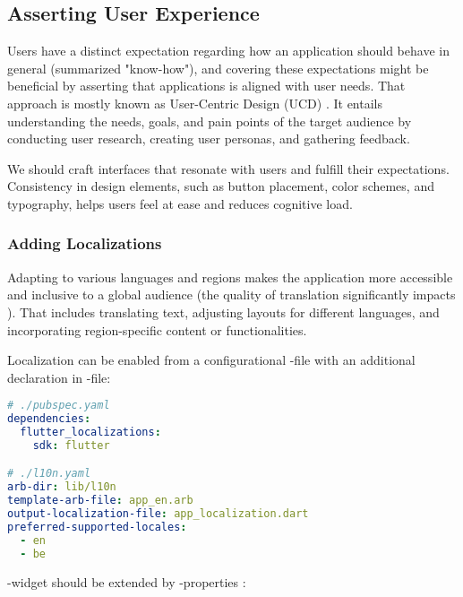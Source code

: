 
\subsection{Asserting User Experience}

Users have a distinct expectation regarding how an application should behave in general (summarized "know-how"), and 
covering these expectations might be beneficial by asserting that applications is aligned with user needs. That approach
is mostly known as User-Centric Design (UCD) \cite{Stil16}. It entails understanding the needs, goals, and pain points 
of the target audience by conducting user research, creating user personas, and gathering feedback. 

We should craft interfaces that resonate with users and fulfill their expectations. Consistency in design elements, 
such as button placement, color schemes, and typography, helps users feel at ease and reduces cognitive load.


\subsubsection{Adding Localizations} \label{locale}

Adapting to various languages and regions makes the application more accessible and inclusive to a global audience (the 
quality of translation significantly impacts \cite{Lomm07}). That includes translating text, adjusting layouts for 
different languages, and incorporating region-specific content or functionalities.

Localization can be enabled from a configurational -file with an additional declaration in 
-file: 

\begin{lstlisting}[language=yaml]
# ./pubspec.yaml
dependencies:
  flutter_localizations:
    sdk: flutter

# ./l10n.yaml
arb-dir: lib/l10n
template-arb-file: app_en.arb
output-localization-file: app_localization.dart
preferred-supported-locales:
  - en
  - be
\end{lstlisting}

\noindent {}-widget should be extended by -properties :

